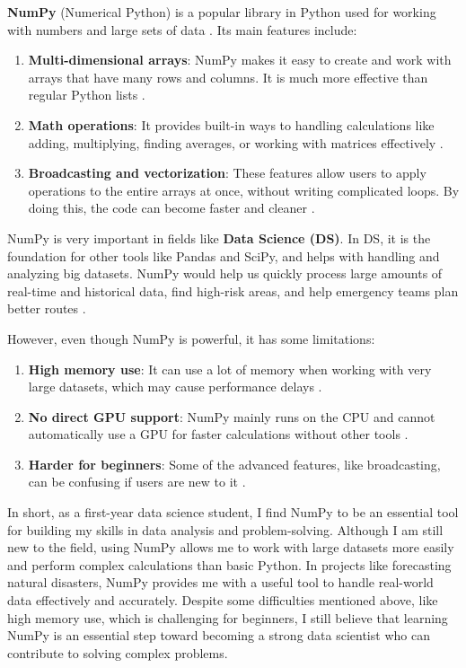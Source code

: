 \documentclass[a4paper, 11pt]{report}
\begin{document}
\textbf{NumPy} (Numerical Python) is a popular library in Python used for working with numbers and large sets of data \cite{harris2020}. Its main features include:

\begin{enumerate}
    \item \textbf{Multi-dimensional arrays}: NumPy makes it easy to create and work with arrays that have many rows and columns. It is much more effective than regular Python lists \cite{harris2020}.
    \item \textbf{Math operations}: It provides built-in ways to handling calculations like adding, multiplying, finding averages, or working with matrices effectively \cite{harris2020}.
    \item \textbf{Broadcasting and vectorization}: These features allow users to apply operations to the entire arrays at once, without writing complicated loops. By doing this, the code can become faster and cleaner \cite{harris2020}.
\end{enumerate}

NumPy is very important in fields like \textbf{Data Science (DS)}. In DS, it is the foundation for other tools like Pandas and SciPy, and helps with handling and analyzing big datasets. NumPy would help us quickly process large amounts of real-time and historical data, find high-risk areas, and help emergency teams plan better routes \cite{idris2013}.

However, even though NumPy is powerful, it has some limitations:

\begin{enumerate}
    \item \textbf{High memory use}: It can use a lot of memory when working with very large datasets, which may cause performance delays \cite{idris2015}.
    \item \textbf{No direct GPU support}: NumPy mainly runs on the CPU and cannot automatically use a GPU for faster calculations without other tools \cite{idris2015}.
    \item \textbf{Harder for beginners}: Some of the advanced features, like broadcasting, can be confusing if users are new to it \cite{idris2015}.
\end{enumerate}

In short, as a first-year data science student, I find NumPy to be an essential tool for building my skills in data analysis and problem-solving. Although I am still new to the field, using NumPy allows me to work with large datasets more easily and perform complex calculations than basic Python. In projects like forecasting natural disasters, NumPy provides me with a useful tool to handle real-world data effectively and accurately. Despite some difficulties mentioned above, like high memory use, which is challenging for beginners, I still believe that learning NumPy is an essential step toward becoming a strong data scientist who can contribute to solving complex problems.
\clearpage
\end{document}
